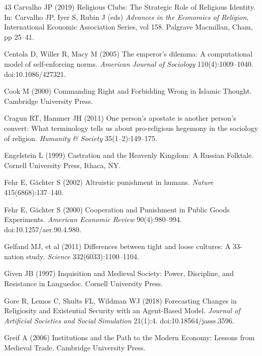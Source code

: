 \documentclass[12pt]{article}
\begin{document}
\begin{thebibliography}{43}
Carvalho JP (2019) Religious Clubs: The Strategic Role of Religious Identity. In: Carvalho JP, Iyer S, Rubin J (eds) \textit{Advances in the Economics of Religion}, International Economic Association Series, vol 158. Palgrave Macmillan, Cham, pp 25--41.

Centola D, Willer R, Macy M (2005) The emperor's dilemma: A computational model of self-enforcing norms. \textit{American Journal of Sociology} 110(4):1009--1040. doi:10.1086/427321.

Cook M (2000) Commanding Right and Forbidding Wrong in Islamic Thought. Cambridge University Press.

Cragun RT, Hammer JH (2011) One person's apostate is another person's convert: What terminology tells us about pro-religious hegemony in the sociology of religion. \textit{Humanity \& Society} 35(1--2):149--175.

Engelstein L (1999) Castration and the Heavenly Kingdom: A Russian Folktale. Cornell University Press, Ithaca, NY.

Fehr E, G\"achter S (2002) Altruistic punishment in humans. \textit{Nature} 415(6868):137--140.

Fehr E, G\"{a}chter S (2000) Cooperation and Punishment in Public Goods Experiments. \textit{American Economic Review} 90(4):980--994. doi:10.1257/aer.90.4.980.

Gelfand MJ, et al (2011) Differences between tight and loose cultures: A 33-nation study. \textit{Science} 332(6033):1100--1104.

Given JB (1997) Inquisition and Medieval Society: Power, Discipline, and Resistance in Languedoc. Cornell University Press.

Gore R, Lemos C, Shults FL, Wildman WJ (2018) Forecasting Changes in Religiosity and Existential Security with an Agent-Based Model. \textit{Journal of Artificial Societies and Social Simulation} 21(1):4. doi:10.18564/jasss.3596.

Greif A (2006) Institutions and the Path to the Modern Economy: Lessons from Medieval Trade. Cambridge University Press.


\end{thebibliography}
\end{document}
